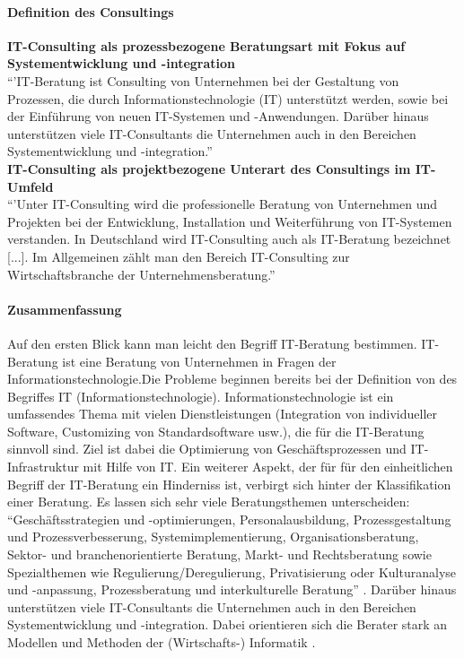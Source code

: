 		\paragraph*{Definition des Consultings}
		\textbf{IT-Consulting als prozessbezogene Beratungsart mit Fokus auf Systementwicklung und -integration}\\
			``'IT-Beratung ist Consulting von Unternehmen bei der Gestaltung von Prozessen, die durch Informationstechnologie (IT) unterstützt werden, sowie bei der Einführung von neuen IT-Systemen und -Anwendungen. Darüber hinaus unterstützen viele IT-Consultants die Unternehmen auch in den Bereichen Systementwicklung und -integration.'' \cite[208]{ReinekeBock200709}\\
			
		\textbf{ IT-Consulting als  projektbezogene Unterart des Consultings im IT-Umfeld}\\
			``'Unter IT-Consulting wird die professionelle Beratung von Unternehmen und Projekten bei der Entwicklung, Installation und Weiterführung von IT-Systemen verstanden. In Deutschland wird IT-Consulting auch als IT-Beratung bezeichnet [...]. Im Allgemeinen zählt man den Bereich IT-Consulting zur Wirtschaftsbranche der Unternehmensberatung.''
			\cite{statistaITCons}
		\paragraph*{Zusammenfassung} 
					Auf den ersten Blick kann man leicht den Begriff IT-Beratung bestimmen. IT-Beratung ist eine Beratung von Unternehmen in Fragen der Informationstechnologie.Die Probleme beginnen bereits bei der Definition von des Begriffes IT (Informationstechnologie). Informationstechnologie ist ein umfassendes Thema mit vielen Dienstleistungen (Integration von individueller Software, Customizing von Standardsoftware usw.), die für die IT-Beratung sinnvoll sind. Ziel ist dabei die Optimierung von Geschäftsprozessen und IT-Infrastruktur mit Hilfe von IT.
			Ein weiterer Aspekt, der für für den einheitlichen Begriff der IT-Beratung ein Hinderniss ist, verbirgt sich hinter der Klassifikation einer Beratung. Es lassen sich sehr viele Beratungsthemen unterscheiden: %
			 ``Geschäftsstrategien und -optimierungen, Personalausbildung, Prozessgestaltung und Prozessverbesserung, Systemimplementierung, Organisationsberatung, Sektor- und branchenorientierte Beratung, Markt- und Rechtsberatung sowie Spezialthemen wie
			Regulierung/Deregulierung,  Privatisierung oder Kulturanalyse und -anpassung, Prozessberatung und  interkulturelle Beratung'' \cite[37]{ReinekeBock200709}.
			Darüber hinaus unterstützen viele IT-Consultants die Unternehmen auch in den Bereichen Systementwicklung und -integration. Dabei orientieren sich die Berater stark an Modellen und Methoden der (Wirtschafts-) Informatik \cite{InfTag2011}.
			

